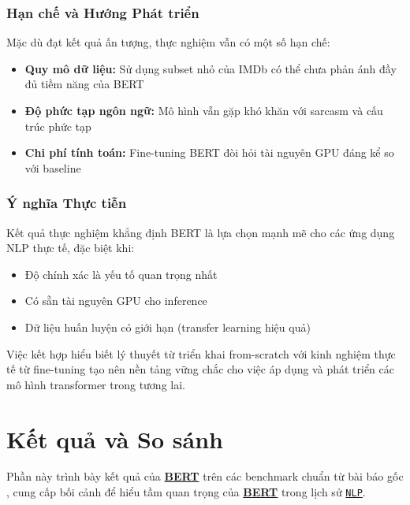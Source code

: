 \subsubsection{Hạn chế và Hướng Phát triển}

Mặc dù đạt kết quả ấn tượng, thực nghiệm vẫn có một số hạn chế:

\begin{itemize}
    \item \textbf{Quy mô dữ liệu:} Sử dụng subset nhỏ của IMDb có thể chưa phản ánh đầy đủ tiềm năng của BERT
    \item \textbf{Độ phức tạp ngôn ngữ:} Mô hình vẫn gặp khó khăn với sarcasm và cấu trúc phức tạp
    \item \textbf{Chi phí tính toán:} Fine-tuning BERT đòi hỏi tài nguyên GPU đáng kể so với baseline
\end{itemize}

\subsubsection{Ý nghĩa Thực tiễn}

Kết quả thực nghiệm khẳng định BERT là lựa chọn mạnh mẽ cho các ứng dụng NLP thực tế, đặc biệt khi:
\begin{itemize}
    \item Độ chính xác là yếu tố quan trọng nhất
    \item Có sẵn tài nguyên GPU cho inference
    \item Dữ liệu huấn luyện có giới hạn (transfer learning hiệu quả)
\end{itemize}

Việc kết hợp hiểu biết lý thuyết từ triển khai from-scratch với kinh nghiệm thực tế từ fine-tuning tạo nên nền tảng vững chắc cho việc áp dụng và phát triển các mô hình transformer trong tương lai.

\section{Kết quả và So sánh}
\label{sec:ket_qua_so_sanh}

Phần này trình bày kết quả của \hyperref[acro:bert]{\textbf{BERT}} trên các benchmark chuẩn từ bài báo gốc \cite{devlin2018bert}, cung cấp bối cảnh để hiểu tầm quan trọng của \hyperref[acro:bert]{\textbf{BERT}} trong lịch sử \hyperref[acro:nlp]{\texttt{NLP}}.

